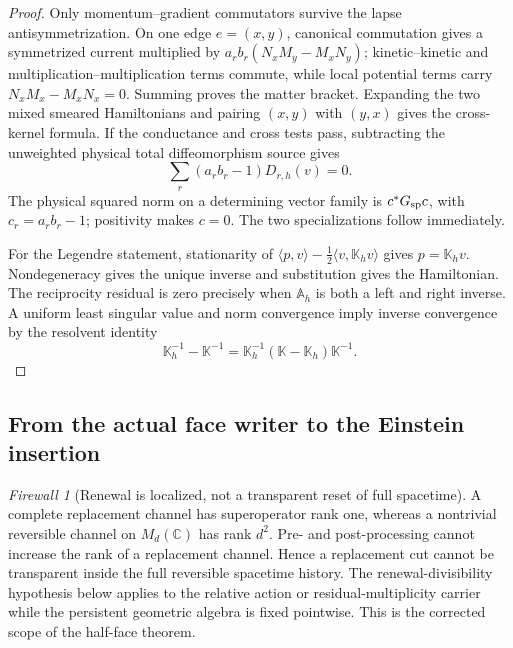 \documentclass[11pt]{article}
\theoremstyle{definition}
\theoremstyle{remark}
\newtheorem{firewall}[theorem]{Firewall}
\newcommand{\C}{\mathbb C}
\begin{document}
\begin{proof}
Only momentum--gradient commutators survive the lapse antisymmetrization.  On
one edge \(e=(x,y)\), canonical commutation gives a symmetrized current
multiplied by
\(a_rb_r(N_xM_y-M_xN_y)\); kinetic--kinetic and multiplication--multiplication
terms commute, while local potential terms carry
\(N_xM_x-M_xN_x=0\).  Summing proves the matter bracket.  Expanding the two
mixed smeared Hamiltonians and pairing \((x,y)\) with \((y,x)\) gives the
cross-kernel formula.  If the conductance and cross tests pass, subtracting the
unweighted physical total diffeomorphism source gives
\[
 \sum_r(a_rb_r-1)D_{r,h}(v)=0.
\]
The physical squared norm on a determining vector family is
\(c^*G_{\rm sp}c\), with \(c_r=a_rb_r-1\); positivity makes \(c=0\).
The two specializations follow immediately.

For the Legendre statement, stationarity of
\(\langle p,v\rangle-\tfrac12\langle v,\mathbb K_hv\rangle\) gives
\(p=\mathbb K_hv\).  Nondegeneracy gives the unique inverse and substitution
gives the Hamiltonian.  The reciprocity residual is zero precisely when
\(\mathbb A_h\) is both a left and right inverse.  A uniform least singular
value and norm convergence imply inverse convergence by the resolvent identity
\[
 \mathbb K_h^{-1}-\mathbb K^{-1}
 =\mathbb K_h^{-1}(\mathbb K-\mathbb K_h)\mathbb K^{-1}.
\]
\end{proof}

\subsection{From the actual face writer to the Einstein insertion}

\begin{firewall}[Renewal is localized, not a transparent reset of full spacetime]
A complete replacement channel has superoperator rank one, whereas a
nontrivial reversible channel on \(M_d(\C)\) has rank \(d^2\).  Pre- and
post-processing cannot increase the rank of a replacement channel.  Hence a
replacement cut cannot be transparent inside the full reversible spacetime
history.  The renewal-divisibility hypothesis below applies to the relative
action or residual-multiplicity carrier while the persistent geometric algebra
is fixed pointwise.  This is the corrected scope of the half-face theorem.
\end{firewall}
\end{document}
